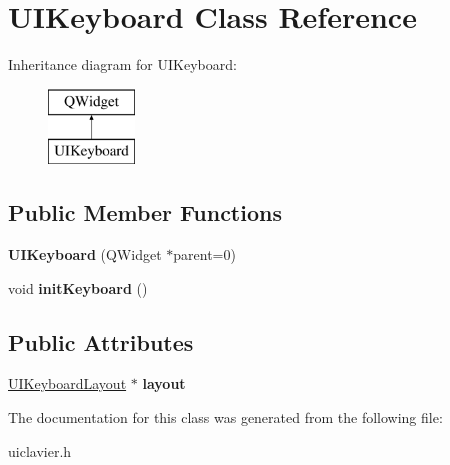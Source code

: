 \hypertarget{class_u_i_keyboard}{}\section{U\+I\+Keyboard Class Reference}
\label{class_u_i_keyboard}
Inheritance diagram for U\+I\+Keyboard\+:\begin{figure}[H]
\begin{center}
\leavevmode
\includegraphics[height=2.000000cm]{class_u_i_keyboard}
\end{center}
\end{figure}
\subsection*{Public Member Functions}
\begin{DoxyCompactItemize}
\item 
{\bfseries U\+I\+Keyboard} (Q\+Widget $\ast$parent=0)\hypertarget{class_u_i_keyboard_a11dfa6dd929e8862b228efbce75cef4d}{}\label{class_u_i_keyboard_a11dfa6dd929e8862b228efbce75cef4d}

\item 
void {\bfseries init\+Keyboard} ()\hypertarget{class_u_i_keyboard_a7abefb6ff0d36a3c7422bfea10def61a}{}\label{class_u_i_keyboard_a7abefb6ff0d36a3c7422bfea10def61a}

\end{DoxyCompactItemize}
\subsection*{Public Attributes}
\begin{DoxyCompactItemize}
\item 
\hyperlink{class_u_i_keyboard_layout}{U\+I\+Keyboard\+Layout} $\ast$ {\bfseries layout}\hypertarget{class_u_i_keyboard_a869e22e5d5af43d5e2f4afabbb3f5953}{}\label{class_u_i_keyboard_a869e22e5d5af43d5e2f4afabbb3f5953}

\end{DoxyCompactItemize}


The documentation for this class was generated from the following file\+:\begin{DoxyCompactItemize}
\item 
uiclavier.\+h\end{DoxyCompactItemize}
